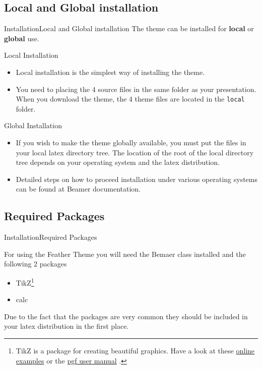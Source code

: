 \documentclass[aspectratio=169]{beamer}
\newcommand{\chref}[2]{
  \href{#1}{\usebeamercolor{fg}{}#2}
}
\begin{document}
\subsection{Local and Global installation}
\begin{frame}{Installation}{Local and Global installation}
  The theme can be installed for \textbf{local} or \textbf{global} use.
  \pause
  \begin{block}{Local Installation}
  \begin{itemize}    
    \item Local installation is the simplest way of installing the theme. 
    \item You need to placing the 4 source files in the same folder as your presentation. When you download the theme, the 4 theme files are located in the {\tt local} folder.
  \end{itemize}
  \end{block}

  \begin{block}{Global Installation}
  \begin{itemize}
     \item If you wish to make the theme globally available, you must put the files in your local latex directory tree. The location of the root of the local directory tree depends on your operating system and the latex distribution. 
     \item Detailed steps on how to proceed installation under various operating systems can be found at Beamer documentation.
  \end{itemize}
  \end{block}
\end{frame}
     

\subsection{Required Packages}
\begin{frame}{Installation}{Required Packages}

  For using the Feather Theme you will need the Bemaer class installed and the following 2 packages
  \begin{itemize}
    \item TikZ\footnote{TikZ is a package for creating beautiful graphics. Have a look at these \chref{http://www.texample.net/tikz/examples/}{online examples} or the \chref{http://tug.ctan.org/tex-archive/graphics/pgf/base/doc/generic/pgf/pgfmanual.pdf}{pgf user manual}.}
    \item calc
  \end{itemize}
  Due to the fact that the packages are very common they should be included in your latex distribution in the first place.
\end{frame}
\end{document}
